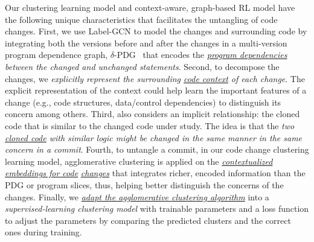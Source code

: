 Our clustering learning model and context-aware, graph-based RL model
have the following unique characteristics that facilitates the
untangling of code changes. First, we use Label-GCN to model the
changes and surrounding code by integrating both the versions before
and after the changes in a multi-version program dependence graph,
$\delta$-PDG~\cite{flexeme-fse20} that encodes the {\em
  \underline{program dependencies} between the changed and unchanged
  statements}. Second, to decompose the changes, we {\em explicitly
  represent the surrounding \underline{code context} of each
  change}. The explicit representation of the context could help
{\tool} learn the important features of a change (e.g., code
structures, data/control dependencies) to distinguish its concern
among others.
%
Third, {\tool} also considers an implicit relationship:
the cloned code that is similar to the changed code under study.
%
The idea is that the {\em two \underline{cloned code} with similar
  logic might be changed in the same manner in the same concern in a
  commit}. Fourth, to untangle a commit, in our code change clustering
learning model, agglomerative clustering is applied on the {\em
  \underline{contextualized embeddings for code}} {\em
  \underline{changes}} that integrates richer, encoded information
than the PDG or program slices, thus, helping better distinguish the
concerns of the changes. Finally, we {\em \underline{adapt the
    agglomerative clustering algorithm}} into a {\em
  supervised-learning clustering model} with trainable parameters and
a loss function to adjust the parameters by comparing the predicted
clusters and the correct ones during training.




